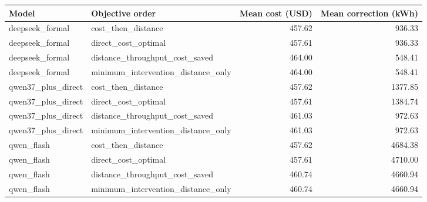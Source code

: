 \begin{tabular}{llrr}
\toprule
Model & Objective order & Mean cost (USD) & Mean correction (kWh) \\
\midrule
deepseek\_formal & cost\_then\_distance & 457.62 & 936.33 \\
deepseek\_formal & direct\_cost\_optimal & 457.61 & 936.33 \\
deepseek\_formal & distance\_throughput\_cost\_saved & 464.00 & 548.41 \\
deepseek\_formal & minimum\_intervention\_distance\_only & 464.00 & 548.41 \\
qwen37\_plus\_direct & cost\_then\_distance & 457.62 & 1377.85 \\
qwen37\_plus\_direct & direct\_cost\_optimal & 457.61 & 1384.74 \\
qwen37\_plus\_direct & distance\_throughput\_cost\_saved & 461.03 & 972.63 \\
qwen37\_plus\_direct & minimum\_intervention\_distance\_only & 461.03 & 972.63 \\
qwen\_flash & cost\_then\_distance & 457.62 & 4684.38 \\
qwen\_flash & direct\_cost\_optimal & 457.61 & 4710.00 \\
qwen\_flash & distance\_throughput\_cost\_saved & 460.74 & 4660.94 \\
qwen\_flash & minimum\_intervention\_distance\_only & 460.74 & 4660.94 \\
\bottomrule
\end{tabular}
